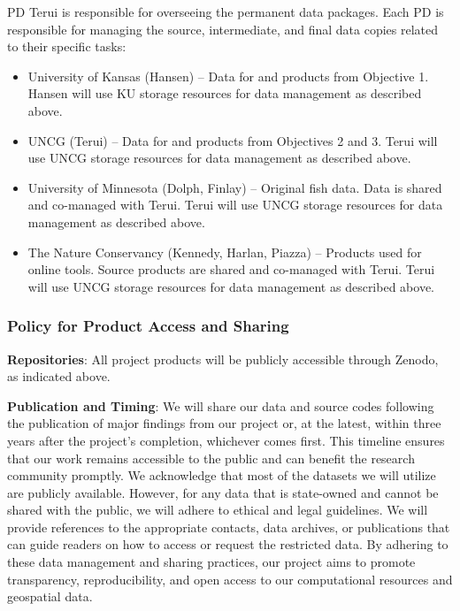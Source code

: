 \documentclass[12pt, class=article, crop=false]{standalone}
\begin{document}
PD Terui is responsible for overseeing the permanent data packages.
Each PD is responsible for managing the source, intermediate, and final data copies related to their specific tasks:
\begin{itemize}
    \item University of Kansas (Hansen) -- 
    Data for and products from Objective 1.
    Hansen will use KU storage resources for data management as described above.
    \item UNCG (Terui) -- 
    Data for and products from Objectives 2 and 3.
    Terui will use UNCG storage resources for data management as described above.
    \item University of Minnesota (Dolph, Finlay) -- 
    Original fish data.
    Data is shared and co-managed with Terui.
    Terui will use UNCG storage resources for data management as described above.
    \item The Nature Conservancy (Kennedy, Harlan, Piazza) -- 
    Products used for online tools.
    Source products are shared and co-managed with Terui.
    Terui will use UNCG storage resources for data management as described above.
\end{itemize}

\subsubsection*{Policy for Product Access and Sharing}

\textbf{Repositories}: All project products will be publicly accessible through Zenodo, as indicated above.

\textbf{Publication and Timing}: We will share our data and source codes following the publication of major findings from our project or, at the latest, within three years after the project's completion, whichever comes first.
This timeline ensures that our work remains accessible to the public and can benefit the research community promptly.
We acknowledge that most of the datasets we will utilize are publicly available.
However, for any data that is state-owned and cannot be shared with the public, we will adhere to ethical and legal guidelines. We will provide references to the appropriate contacts, data archives, or publications that can guide readers on how to access or request the restricted data.
By adhering to these data management and sharing practices, our project aims to promote transparency, reproducibility, and open access to our computational resources and geospatial data.
\end{document}
